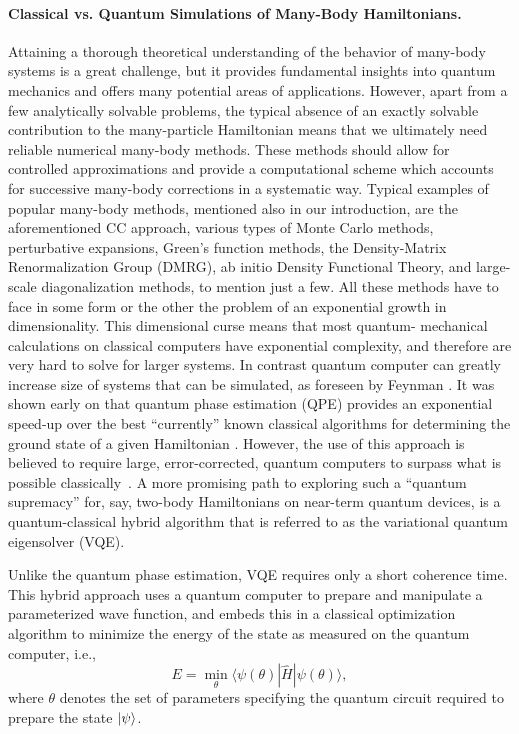 \documentclass[11pt]{article}
\begin{document}
\paragraph{Classical vs. Quantum Simulations of Many-Body Hamiltonians.}
Attaining a thorough theoretical understanding of the behavior of many-body systems is a great challenge, but it provides fundamental insights into quantum  mechanics and offers many potential areas of applications.
However, apart from a few analytically solvable problems, the typical absence of an exactly solvable contribution to the
many-particle Hamiltonian means that we ultimately need reliable numerical many-body methods.
These methods should allow for controlled approximations
and provide a computational scheme which accounts for successive
many-body corrections in a systematic way.
Typical examples of popular many-body methods, mentioned also in our introduction, are the aforementioned CC approach, various types of Monte Carlo methods, perturbative expansions, Green's function methods, the Density-Matrix Renormalization Group (DMRG),
ab initio Density Functional Theory, and large-scale diagonalization methods, to mention just a few.
All these methods have to face in some form or the other the problem of 
an exponential growth in dimensionality. This dimensional curse means that most quantum- mechanical calculations on classical computers have exponential
complexity, and therefore are very hard to solve for larger systems. In contrast quantum computer can greatly increase size of systems that can be simulated, as
foreseen by Feynman \cite{Feynman:1981tf}.  It was shown early on that quantum phase estimation (QPE) provides an
exponential speed-up over the best ``currently'' known classical algorithms for determining
the ground state of a given Hamiltonian \cite{aspuru2005simulated}. However, the use
of this approach is believed to require large, error-corrected, quantum
computers to surpass what is possible classically~\cite{reiher2017elucidating,babbush2018encoding}.
A more promising path to exploring such a ``quantum supremacy''\cite{boixo2018characterizing,harrow2017quantum} for, say, two-body Hamiltonians on near-term quantum
devices, is a quantum-classical hybrid algorithm that is referred to as the variational quantum
eigensolver (VQE)\cite{peruzzo2014variational,McArdle2018}.

Unlike the quantum phase estimation, VQE requires only a short coherence time.
This hybrid approach uses a quantum computer to prepare and
manipulate a parameterized wave function, and {embeds this in} a classical optimization
algorithm to minimize the energy of the state as measured on the quantum computer, i.e., 
\begin{equation}
E = \min_{\theta} \langle\psi(\theta)|\hat{H}|\psi(\theta)\rangle,
\label{eq:vqe}
\end{equation}
where $\theta$ denotes the set of parameters specifying the quantum circuit required to prepare the state $\ket{\psi}$.
\end{document}
